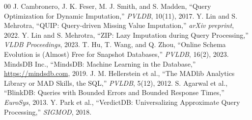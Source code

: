 \documentclass[conference]{IEEEtran}
\begin{document}
\begin{thebibliography}{00}
 J. Cambronero, J. K. Feser, M. J. Smith, and S. Madden, ``Query Optimization for Dynamic Imputation,'' \textit{PVLDB}, 10(11), 2017.
 Y. Lin and S. Mehrotra, ``QUIP: Query-driven Missing Value Imputation,'' \textit{arXiv preprint}, 2022.
 Y. Lin and S. Mehrotra, ``ZIP: Lazy Imputation during Query Processing,'' \textit{VLDB Proceedings}, 2023.
 T. Hu, T. Wang, and Q. Zhou, ``Online Schema Evolution is (Almost) Free for Snapshot Databases,'' \textit{PVLDB}, 16(2), 2023.
 MindsDB Inc., ``MindsDB: Machine Learning in the Database,'' \url{https://mindsdb.com}, 2019.
 J. M. Hellerstein et al., ``The MADlib Analytics Library or MAD Skills, the SQL,'' \textit{PVLDB}, 5(12), 2012.
 S. Agarwal et al., ``BlinkDB: Queries with Bounded Errors and Bounded Response Times,'' \textit{EuroSys}, 2013.
 Y. Park et al., ``VerdictDB: Universalizing Approximate Query Processing,'' \textit{SIGMOD}, 2018.
\end{thebibliography}
\end{document}
